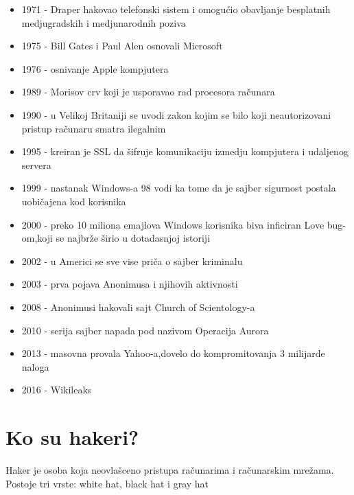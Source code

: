 \documentclass[a4paper]{article}
\begin{document}
\begin{itemize}
\item 1971 - Draper hakovao telefonski sistem i omogućio obavljanje besplatnih medjugradskih i medjunarodnih poziva
\item 1975 - Bill Gates i Paul Alen osnovali Microsoft
\item 1976 - osnivanje Apple kompjutera
\item 1989 - Morisov crv koji je usporavao rad procesora računara
\item 1990 - u Velikoj Britaniji se uvodi zakon kojim se bilo koji neautorizovani pristup računaru smatra ilegalnim
\item 1995 - kreiran je SSL da šifruje komunikaciju izmedju kompjutera i udaljenog servera
\item 1999 - nastanak Windows-a 98 vodi ka tome da je sajber sigurnost postala uobičajena kod korisnika
\item 2000 - preko 10 miliona emajlova Windows korisnika biva inficiran Love bug-om,koji se najbrže širio u dotadasnjoj istoriji
\item 2002 - u Americi se sve vise priča o sajber kriminalu
\item 2003 - prva pojava Anonimusa i njihovih aktivnosti
\item 2008 - Anonimusi hakovali sajt Church of Scientology-a
\item 2010 - serija sajber napada pod nazivom Operacija Aurora 
\item 2013 - masovna provala Yahoo-a,dovelo do kompromitovanja 3 milijarde naloga
\item 2016 - Wikileaks

\end{itemize} 

\newpage


\section{Ko su hakeri?}	
\label{sec:naslov1}
Haker je osoba koja neovlašceno pristupa računarima i računarskim mrežama.
\newline
Postoje tri vrste: white hat, black hat i gray hat
\end{document}
